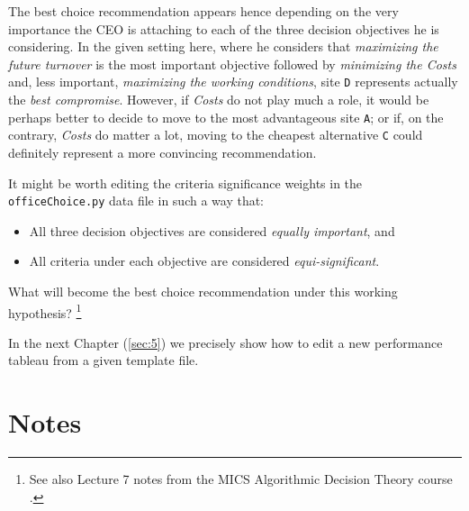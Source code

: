 The best choice recommendation appears hence depending on the very importance the CEO is attaching to each of the three decision objectives he is considering. In the given setting here, where he considers that \emph{maximizing the future turnover} is the most important objective followed by \emph{minimizing the Costs} and, less important, \emph{maximizing the working conditions}, site \texttt{D} represents actually the \emph{best compromise}. However, if \emph{Costs} do not play much a role, it would be perhaps better to decide to move to the most advantageous site \texttt{A}; or if, on the contrary, \emph{Costs} do matter a lot, moving to the cheapest alternative \texttt{C} could definitely represent a more convincing recommendation. 

It might be worth editing the criteria significance weights in the \texttt{officeChoice.py} data file in such a way that:
\begin{itemize}
\item All three decision objectives are considered \emph{equally important}, and
\item All criteria under each objective are considered \emph{equi-significant}.
\end{itemize}
What will become the best choice recommendation under this working hypothesis? \footnote{See also Lecture 7 notes from the MICS Algorithmic Decision Theory course \citep{ADT-L7}.} 

In the next Chapter (\ref{sec:5}) we precisely show how to edit a new performance tableau from a given template file. 

{}
\section*{Notes}

